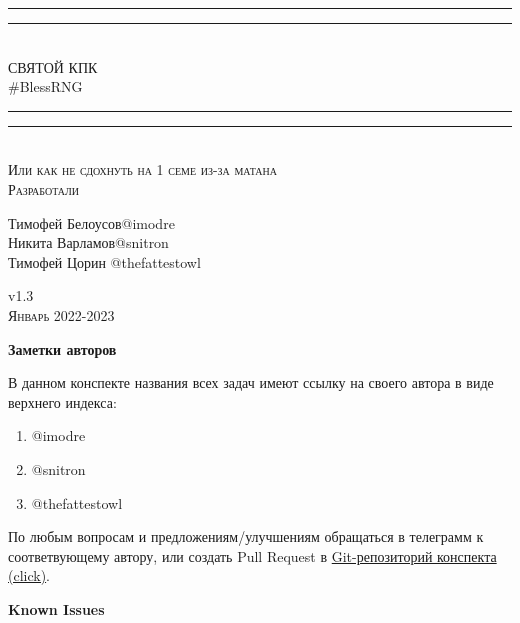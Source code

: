 \documentclass{article}
\begin{document}
\begin{titlepage}
    \centering
    \vspace*{\baselineskip}
    \rule{\textwidth}{1.6pt}\vspace*{-\baselineskip}\vspace*{2pt}
    \rule{\textwidth}{0.4pt}\\[\baselineskip]
{\LARGE СВЯТОЙ КПК\\ [0.3\baselineskip] \#BlessRNG}\\[0.2\baselineskip]
    \rule{\textwidth}{0.4pt}\vspace*{-\baselineskip}\vspace{3.2pt}
    \rule{\textwidth}{1.6pt}\\[\baselineskip]
    \scshape
    Или как не сдохнуть на 1 семе из-за матана \\
    \vspace*{2\baselineskip}
    Разработали \\[\baselineskip]
    {\Large Тимофей Белоусов\quad @imodre \\ Никита Варламов\quad @snitron \\ Тимофей Цорин \quad @thefattestowl\par}
    \vfill
    v1.3\\
    {\scshape Январь 2022-2023} \par
\end{titlepage}

\textbf{Заметки авторов}

В данном конспекте названия всех задач имеют ссылку на своего автора в виде верхнего индекса:
\begin{enumerate}
    \item @imodre
    \item @snitron
    \item @thefattestowl
\end{enumerate}
По любым вопросам и предложениям/улучшениям обращаться в телеграмм к соответвующему автору, или создать Pull Request в \href{https://github.com/snitron/ct-itmo}{Git-репозиторий конспекта (click)}.

\textbf{Known Issues}
\end{document}
